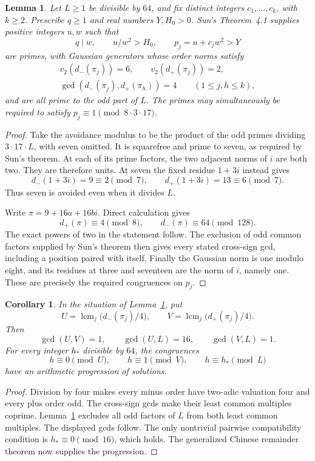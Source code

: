 \documentclass[11pt,a4paper]{article}
\newtheorem{lemma}[theorem]{Lemma}
\newtheorem{corollary}[theorem]{Corollary}
\theoremstyle{remark}\newtheorem{remark}[theorem]{Remark}
\begin{document}
\begin{lemma}\label{lem:arbitrary-avoidance}
Let $L\ge1$ be divisible by $64$, and fix distinct integers
$c_1,\ldots,c_k$, with $k\ge2$. Prescribe $q\ge1$ and real numbers
$Y,H_0>0$. Sun's Theorem~4.1 supplies positive integers $u,w$ such that
\[
 q\mid w,\qquad u/w^2>H_0,\qquad p_j=u+c_jw^2>Y
\]
are primes, with Gaussian generators whose order norms satisfy
\[
 \begin{gathered}
 v_2(d_-(\pi_j))=6,\qquad v_2(d_+(\pi_j))=2,\\
 \gcd(d_-(\pi_j),d_+(\pi_h))=4\qquad(1\le j,h\le k),
 \end{gathered}
\]
and are all prime to the odd part of $L$. The primes may simultaneously
be required to satisfy $p_j\equiv1\pmod{8\cdot3\cdot17}$.
\end{lemma}
\begin{proof}
Take the avoidance modulus to be the product of the odd primes dividing
$3\cdot17\cdot L$, with seven omitted. It is squarefree and prime
to seven, as required by Sun's theorem. At each of its prime factors,
the two adjacent norms of $i$ are both two. They are therefore units.
At seven the fixed residue $1+3i$ instead gives
\[
       d_-(1+3i)=9\equiv2\pmod7,\qquad
       d_+(1+3i)=13\equiv6\pmod7.
\]
Thus seven is avoided even when it divides $L$.

Write $\pi=9+16a+16bi$. Direct calculation gives
\[
 d_+(\pi)\equiv4\pmod8,
 \qquad d_-(\pi)\equiv64\pmod{128}.
\]
The exact powers of two in the statement follow. The exclusion of odd
common factors supplied by Sun's theorem then gives every stated
cross-sign gcd, including a position paired with itself.
Finally the Gaussian norm is one modulo eight, and its residues at
three and seventeen are the norm of $i$, namely one. These are precisely
the required congruences on $p_j$.
\end{proof}

\begin{corollary}\label{cor:compatible-progressions}
In the situation of Lemma~\ref{lem:arbitrary-avoidance}, put
\[
 U=\operatorname{lcm}_j\bigl(d_-(\pi_j)/4\bigr),\qquad
 V=\operatorname{lcm}_j\bigl(d_+(\pi_j)/4\bigr).
\]
Then
\[
              \gcd(U,V)=1,\qquad\gcd(U,L)=16,
              \qquad\gcd(V,L)=1.
\]
For every integer $h_*$ divisible by $64$, the congruences
\[
                 h\equiv0\pmod U,\qquad
                 h\equiv1\pmod V,\qquad
                 h\equiv h_*\pmod L
\]
have an arithmetic progression of solutions.
\end{corollary}
\begin{proof}
Division by four makes every minus order have two-adic valuation four
and every plus order odd. The cross-sign gcds make their least common
multiples coprime. Lemma~\ref{lem:arbitrary-avoidance} excludes all odd
factors of $L$ from both least common multiples. The displayed gcds
follow. The only nontrivial pairwise compatibility condition is
$h_*\equiv0\pmod{16}$, which holds. The generalized Chinese remainder
theorem now supplies the progression.
\end{proof}
\end{document}
